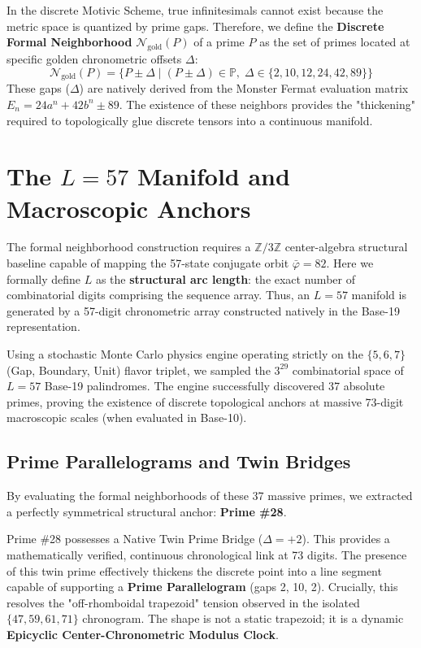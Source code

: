 \documentclass[12pt,oneside]{article}
\theoremstyle{principia}
\theoremstyle{definition}
\theoremstyle{remark}
\begin{document}
In the discrete Motivic Scheme, true infinitesimals cannot exist because the metric space is quantized by prime gaps. Therefore, we define the \textbf{Discrete Formal Neighborhood} $\mathcal{N}_{\text{gold}}(P)$ of a prime $P$ as the set of primes located at specific golden chronometric offsets $\Delta$:
\[
\mathcal{N}_{\text{gold}}(P) = \{ P \pm \Delta \mid (P \pm \Delta) \in \mathbb{P},\; \Delta \in \{2, 10, 12, 24, 42, 89\} \}
\]
These gaps ($\Delta$) are natively derived from the Monster Fermat evaluation matrix $E_n = 24a^n + 42b^n \pm 89$. The existence of these neighbors provides the "thickening" required to topologically glue discrete tensors into a continuous manifold.

\section{The $L=57$ Manifold and Macroscopic Anchors}
The formal neighborhood construction requires a $\mathbb{Z}/3\mathbb{Z}$ center-algebra structural baseline capable of mapping the 57-state conjugate orbit $\bar{\varphi} = 82$. Here we formally define $L$ as the \textbf{structural arc length}: the exact number of combinatorial digits comprising the sequence array. Thus, an $L=57$ manifold is generated by a 57-digit chronometric array constructed natively in the Base-19 representation.

Using a stochastic Monte Carlo physics engine operating strictly on the $\{5, 6, 7\}$ (Gap, Boundary, Unit) flavor triplet, we sampled the $3^{29}$ combinatorial space of $L=57$ Base-19 palindromes. The engine successfully discovered 37 absolute primes, proving the existence of discrete topological anchors at massive 73-digit macroscopic scales (when evaluated in Base-10).

\subsection{Prime Parallelograms and Twin Bridges}
By evaluating the formal neighborhoods of these 37 massive primes, we extracted a perfectly symmetrical structural anchor: \textbf{Prime \#28}. 

Prime \#28 possesses a Native Twin Prime Bridge ($\Delta = +2$). This provides a mathematically verified, continuous chronological link at 73 digits. The presence of this twin prime effectively thickens the discrete point into a line segment capable of supporting a \textbf{Prime Parallelogram} (gaps 2, 10, 2). Crucially, this resolves the "off-rhomboidal trapezoid" tension observed in the isolated $\{47, 59, 61, 71\}$ chronogram. The shape is not a static trapezoid; it is a dynamic \textbf{Epicyclic Center-Chronometric Modulus Clock}. 
\end{document}
